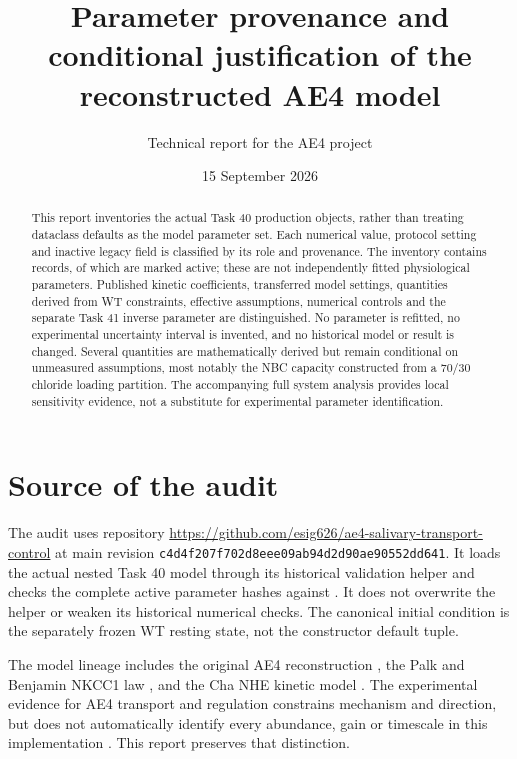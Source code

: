 \documentclass[11pt,a4paper]{article}
\title{Parameter provenance and conditional justification of the reconstructed AE4 model}
\author{Technical report for the AE4 project}
\date{15 September 2026}
\begin{document}
\maketitle
\begin{abstract}
This report inventories the actual Task 40 production objects, rather than treating dataclass defaults as the model parameter set. Each numerical value, protocol setting and inactive legacy field is classified by its role and provenance. The inventory contains \InventoryCount{} records, of which \ActiveCount{} are marked active; these are not independently fitted physiological parameters. Published kinetic coefficients, transferred model settings, quantities derived from WT constraints, effective assumptions, numerical controls and the separate Task 41 inverse parameter are distinguished. No parameter is refitted, no experimental uncertainty interval is invented, and no historical model or result is changed. Several quantities are mathematically derived but remain conditional on unmeasured assumptions, most notably the NBC capacity constructed from a 70/30 chloride loading partition. The accompanying full system analysis provides local sensitivity evidence, not a substitute for experimental parameter identification.
\end{abstract}

\section{Source of the audit}
The audit uses repository \url{https://github.com/esig626/ae4-salivary-transport-control} at main revision \texttt{c4d4f207f702d8eee09ab94d2d90ae90552dd641}. It loads the actual nested Task 40 model through its historical validation helper and checks the complete active parameter hashes against . It does not overwrite the helper or weaken its historical numerical checks. The canonical initial condition is the separately frozen WT resting state, not the constructor default tuple.

The model lineage includes the original AE4 reconstruction \citep{VeraSiguenza2018}, the Palk and Benjamin NKCC1 law \citep{Palk2010,Benjamin1997}, and the Cha NHE kinetic model \citep{Cha2009}. The experimental evidence for AE4 transport and regulation constrains mechanism and direction, but does not automatically identify every abundance, gain or timescale in this implementation \citep{Pena2015,Pena2016,Pena2021,Catalan2025}. This report preserves that distinction.
\end{document}
